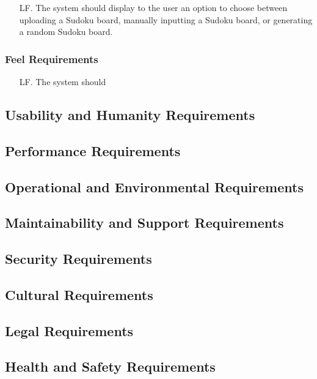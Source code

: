 \documentclass[11pt]{article}
\begin{document}
\begin{enumerate} %
    \item [LF.] The system should display to the user an option to choose between uploading a Sudoku board, manually inputting a Sudoku board, or generating a random Sudoku board.
\end{enumerate}

\subsubsection{Feel Requirements}

\begin{enumerate}
    \item [LF.] The system should 
\end{enumerate}

\subsection{Usability and Humanity Requirements}

\subsection{Performance Requirements}

\subsection{Operational and Environmental Requirements}

\subsection{Maintainability and Support Requirements}

\subsection{Security Requirements}

\subsection{Cultural Requirements}

\subsection{Legal Requirements}

\subsection{Health and Safety Requirements}
\end{document}
